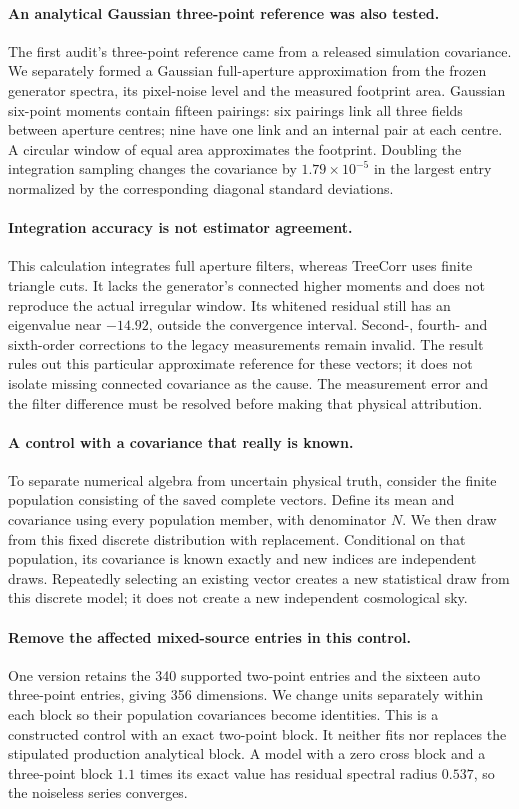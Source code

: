 \documentclass[11pt]{article}
\begin{document}
\paragraph{An analytical Gaussian three-point reference was also tested.}
The first audit's three-point reference came from a released simulation
covariance. We separately formed a Gaussian full-aperture approximation
from the frozen generator spectra, its pixel-noise level and the measured
footprint area. Gaussian six-point moments contain fifteen pairings:
six pairings link all three fields between aperture centres; nine have
one link and an internal pair at each centre. A circular window of equal
area approximates the footprint. Doubling the integration sampling changes
the covariance by $1.79\times10^{-5}$ in the largest entry normalized by
the corresponding diagonal standard deviations.

\paragraph{Integration accuracy is not estimator agreement.}
This calculation integrates full aperture filters, whereas TreeCorr uses
finite triangle cuts. It lacks the generator's connected higher moments
and does not reproduce the actual irregular window. Its whitened residual
still has an eigenvalue near $-14.92$, outside the convergence interval.
Second-, fourth- and sixth-order corrections to the legacy measurements
remain invalid. The result rules out this particular approximate reference
for these vectors; it does not isolate missing connected covariance as
the cause. The measurement error and the filter difference must be resolved
before making that physical attribution.

\paragraph{A control with a covariance that really is known.}
To separate numerical algebra from uncertain physical truth, consider the
finite population consisting of the saved complete vectors. Define its
mean and covariance using every population member, with denominator $N$.
We then draw from this fixed discrete distribution with replacement.
Conditional on that population, its covariance is known exactly and new
indices are independent draws. Repeatedly selecting an existing vector
creates a new statistical draw from this discrete model; it does not
create a new independent cosmological sky.

\paragraph{Remove the affected mixed-source entries in this control.}
One version retains the 340 supported two-point entries and the sixteen
auto three-point entries, giving 356 dimensions. We change units separately
within each block so their population covariances become identities. This
is a constructed control with an exact two-point block. It neither fits
nor replaces the stipulated production analytical block. A model with a
zero cross block and a three-point block $1.1$ times its exact value has
residual spectral radius $0.537$, so the noiseless series converges.
\end{document}
